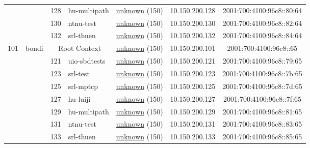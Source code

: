 \begin{small}
\begin{center}
\begin{longtable}{|c|c|c|c|c|c|c|c|}
  &  & \tiny{128} & \multicolumn{1}{|l|}{\tiny{hu-multipath}} & \multicolumn{2}{|c|}{\tiny{\href{}{unknown} (150)}} & \tiny{10.150.200.128} & \tiny{2001:700:4100:96c8::80:64} \\* \cline{3-3}\cline{4-4}\cline{5-5}\cline{6-6}\cline{7-7}\cline{8-8}
  &  & \tiny{130} & \multicolumn{1}{|l|}{\tiny{ntnu-test}} & \multicolumn{2}{|c|}{\tiny{\href{}{unknown} (150)}} & \tiny{10.150.200.130} & \tiny{2001:700:4100:96c8::82:64} \\* \cline{3-3}\cline{4-4}\cline{5-5}\cline{6-6}\cline{7-7}\cline{8-8}
  &  & \tiny{132} & \multicolumn{1}{|l|}{\tiny{srl-thuen}} & \multicolumn{2}{|c|}{\tiny{\href{}{unknown} (150)}} & \tiny{10.150.200.132} & \tiny{2001:700:4100:96c8::84:64} \\ \hline
 \multirow{8}{*}{\tiny{101}} & \multicolumn{1}{|l|}{\multirow{8}{*}{\tiny{bondi}}} & \multicolumn{2}{|c|}{\tiny{Root Context}} & \multicolumn{2}{|c|}{\tiny{\href{}{unknown} (150)}} & \tiny{10.150.200.101} & \tiny{2001:700:4100:96c8::65} \\* \cline{3-3}\cline{4-4}\cline{5-5}\cline{6-6}\cline{7-7}\cline{8-8}
  &  & \tiny{121} & \multicolumn{1}{|l|}{\tiny{uio-sbdtests}} & \multicolumn{2}{|c|}{\tiny{\href{}{unknown} (150)}} & \tiny{10.150.200.121} & \tiny{2001:700:4100:96c8::79:65} \\* \cline{3-3}\cline{4-4}\cline{5-5}\cline{6-6}\cline{7-7}\cline{8-8}
  &  & \tiny{123} & \multicolumn{1}{|l|}{\tiny{srl-test}} & \multicolumn{2}{|c|}{\tiny{\href{}{unknown} (150)}} & \tiny{10.150.200.123} & \tiny{2001:700:4100:96c8::7b:65} \\* \cline{3-3}\cline{4-4}\cline{5-5}\cline{6-6}\cline{7-7}\cline{8-8}
  &  & \tiny{125} & \multicolumn{1}{|l|}{\tiny{srl-mptcp}} & \multicolumn{2}{|c|}{\tiny{\href{}{unknown} (150)}} & \tiny{10.150.200.125} & \tiny{2001:700:4100:96c8::7d:65} \\* \cline{3-3}\cline{4-4}\cline{5-5}\cline{6-6}\cline{7-7}\cline{8-8}
  &  & \tiny{127} & \multicolumn{1}{|l|}{\tiny{hu-luiji}} & \multicolumn{2}{|c|}{\tiny{\href{}{unknown} (150)}} & \tiny{10.150.200.127} & \tiny{2001:700:4100:96c8::7f:65} \\* \cline{3-3}\cline{4-4}\cline{5-5}\cline{6-6}\cline{7-7}\cline{8-8}
  &  & \tiny{129} & \multicolumn{1}{|l|}{\tiny{hu-multipath}} & \multicolumn{2}{|c|}{\tiny{\href{}{unknown} (150)}} & \tiny{10.150.200.129} & \tiny{2001:700:4100:96c8::81:65} \\* \cline{3-3}\cline{4-4}\cline{5-5}\cline{6-6}\cline{7-7}\cline{8-8}
  &  & \tiny{131} & \multicolumn{1}{|l|}{\tiny{ntnu-test}} & \multicolumn{2}{|c|}{\tiny{\href{}{unknown} (150)}} & \tiny{10.150.200.131} & \tiny{2001:700:4100:96c8::83:65} \\* \cline{3-3}\cline{4-4}\cline{5-5}\cline{6-6}\cline{7-7}\cline{8-8}
  &  & \tiny{133} & \multicolumn{1}{|l|}{\tiny{srl-thuen}} & \multicolumn{2}{|c|}{\tiny{\href{}{unknown} (150)}} & \tiny{10.150.200.133} & \tiny{2001:700:4100:96c8::85:65} \\ \hline
\end{longtable}
\end{center}
\end{small}
